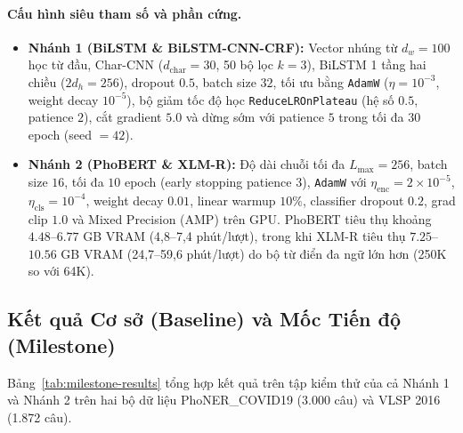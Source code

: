 \paragraph{Cấu hình siêu tham số và phần cứng.}
\begin{itemize}
    \item \textbf{Nhánh 1 (BiLSTM \& BiLSTM-CNN-CRF):} Vector nhúng từ $d_w = 100$ học từ đầu, Char-CNN ($d_{\text{char}} = 30$, 50 bộ lọc $k = 3$), BiLSTM 1 tầng hai chiều ($2d_h = 256$), dropout $0.5$, batch size $32$, tối ưu bằng \texttt{AdamW} ($\eta = 10^{-3}$, weight decay $10^{-5}$), bộ giảm tốc độ học \texttt{ReduceLROnPlateau} (hệ số $0.5$, patience $2$), cắt gradient $5.0$ và dừng sớm với patience $5$ trong tối đa $30$ epoch (seed $= 42$).
    \item \textbf{Nhánh 2 (PhoBERT \& XLM-R):} Độ dài chuỗi tối đa $L_{\max} = 256$, batch size $16$, tối đa $10$ epoch (early stopping patience $3$), \texttt{AdamW} với $\eta_{\text{enc}} = 2\times 10^{-5}$, $\eta_{\text{cls}} = 10^{-4}$, weight decay $0.01$, linear warmup $10\%$, classifier dropout $0.2$, grad clip $1.0$ và Mixed Precision (AMP) trên GPU. PhoBERT tiêu thụ khoảng $4.48$--$6.77$ GB VRAM (4,8--7,4 phút/lượt), trong khi XLM-R tiêu thụ $7.25$--$10.56$ GB VRAM (24,7--59,6 phút/lượt) do bộ từ điển đa ngữ lớn hơn (250K so với 64K).
\end{itemize}

\subsection{Kết quả Cơ sở (Baseline) và Mốc Tiến độ (Milestone)}
\label{sec:exp-results}

Bảng~\ref{tab:milestone-results} tổng hợp kết quả trên tập kiểm thử của cả Nhánh 1 và Nhánh 2 trên hai bộ dữ liệu PhoNER\_COVID19 (3.000 câu) và VLSP 2016 (1.872 câu).

